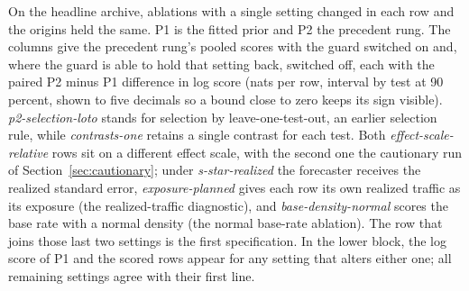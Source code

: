 \begin{table}[t]\centering\small
\caption{On the headline archive, ablations with a single setting changed in each row and the origins held the same. P1 is the fitted prior and P2 the precedent rung. The columns give the precedent rung's pooled scores with the guard switched on and, where the guard is able to hold that setting back, switched off, each with the paired P2 minus P1 difference in log score (nats per row, interval by test at 90 percent, shown to five decimals so a bound close to zero keeps its sign visible). \emph{p2-selection-loto} stands for selection by leave-one-test-out, an earlier selection rule, while \emph{contrasts-one} retains a single contrast for each test. Both \emph{effect-scale-relative} rows sit on a different effect scale, with the second one the cautionary run of Section~\ref{sec:cautionary}; under \emph{s-star-realized} the forecaster receives the realized standard error, \emph{exposure-planned} gives each row its own realized traffic as its exposure (the realized-traffic diagnostic), and \emph{base-density-normal} scores the base rate with a normal density (the normal base-rate ablation). The row that joins those last two settings is the first specification. In the lower block, the log score of P1 and the scored rows appear for any setting that alters either one; all remaining settings agree with their first line.}
\label{tab:ablations-upworthy}
\resizebox{\textwidth}{!}{}

\vspace{0.5em}

\end{table}


